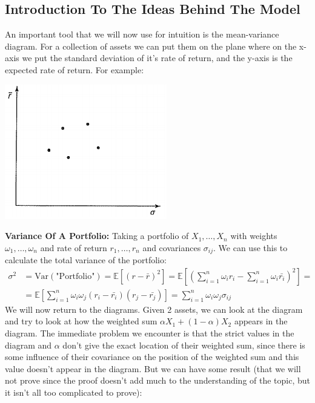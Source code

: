 \documentclass{article}
\begin{document}
\subsection{Introduction To The Ideas Behind The Model}
An important tool that we will now use for intuition is the mean-variance diagram. For a collection of assets we can put them on the plane where on the x-axis we put the standard deviation of it's rate of return, and the y-axis is the expected rate of return. For example:
\begin{center}
    \includegraphics{images/First_Optimization_Photo.png}
\end{center}
\textbf{Variance Of A Portfolio: }Taking a portfolio of $X_1,\dots,X_n$ with weights $\omega_1,\dots,\omega_n$ and rate of return $r_1,\dots,r_n$ and covariances $\sigma_{ij}$. We can use this to calculate the total variance of the portfolio: 
\begin{align*}
    \sigma^2&=\text{Var}(\text{"Portfolio"})=\mathbb{E}\left[(r-\bar{r})^2\right]=\mathbb{E}\left[\left(\sum_{i=1}^n \omega_i r_i - \sum_{i=1}^n \omega_i \bar{r_i}\right)^2\right]= \\
     &= \mathbb{E}\left[\sum_{i=1}^n \omega_i\omega_j(r_i-\bar{r_i})(r_j-\bar{r_j})\right] = \sum_{i=1}^n\omega_i\omega_j \sigma_{ij}
\end{align*}
We will now return to the diagrams. Given 2 assets, we can look at the diagram and try to look at how the weighted sum $\alpha X_1+(1-\alpha)X_2$ appears in the diagram. The immediate problem we encounter is that the strict values in the diagram and $\alpha$ don't give the exact location of their weighted sum, since there is some influence of their covariance on the position of the weighted sum and this value doesn't appear in the diagram. But we can have some result (that we will not prove since the proof doesn't add much to the understanding of the topic, but it isn't all too complicated to prove): \\ \\
\end{document}
